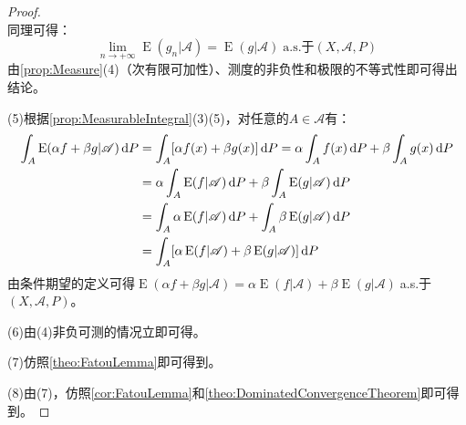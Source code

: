 \begin{proof}
\begin{equation*}
	\end{equation*}
	同理可得：
	\begin{equation*}
		\lim_{n\to+\infty}\operatorname{E}(g_n|\mathscr{A})=\operatorname{E}(g|\mathscr{A})\;\text{a.s.于}(X,\mathscr{A},P)
	\end{equation*}
	由\cref{prop:Measure}(4)（次有限可加性）、测度的非负性和极限的不等式性即可得出结论。\par
	(5)根据\cref{prop:MeasurableIntegral}(3)(5)，对任意的$A\in\mathscr{A}$有：
	\begin{align*}
		\int_{A}\operatorname{E}(\alpha f+\beta g|\mathscr{A})\dif P&=\int_{A}[\alpha f(x)+\beta g(x)]\dif P=\alpha\int_{A}f(x)\dif P+\beta\int_{A}g(x)\dif P \\
		&=\alpha\int_{A}\operatorname{E}(f|\mathscr{A})\dif P+\beta\int_{A}\operatorname{E}(g|\mathscr{A})\dif P \\
		&=\int_{A}\alpha\operatorname{E}(f|\mathscr{A})\dif P+\int_{A}\beta\operatorname{E}(g|\mathscr{A})\dif P \\
		&=\int_{A}[\alpha\operatorname{E}(f|\mathscr{A})+\beta\operatorname{E}(g|\mathscr{A})]\dif P
	\end{align*}
	由条件期望的定义可得$\operatorname{E}(\alpha f+\beta g|\mathscr{A})=\alpha\operatorname{E}(f|\mathscr{A})+\beta\operatorname{E}(g|\mathscr{A})\;$a.s.于$(X,\mathscr{A},P)$。\par
	(6)由(4)非负可测的情况立即可得。\par
	(7)仿照\cref{theo:FatouLemma}即可得到。\par
	(8)由(7)，仿照\cref{cor:FatouLemma}和\cref{theo:DominatedConvergenceTheorem}即可得到。
\end{proof}

